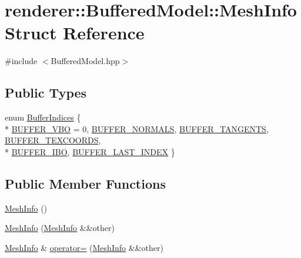 \hypertarget{structrenderer_1_1BufferedModel_1_1MeshInfo}{\section{renderer\-:\-:Buffered\-Model\-:\-:Mesh\-Info Struct Reference}
\label{structrenderer_1_1BufferedModel_1_1MeshInfo}
}


{\ttfamily \#include $<$Buffered\-Model.\-hpp$>$}

\subsection*{Public Types}
\begin{DoxyCompactItemize}
\item 
enum \hyperlink{structrenderer_1_1BufferedModel_1_1MeshInfo_ae21111fafd86318119b109567aa3e045}{Buffer\-Indices} \{ \\*
\hyperlink{structrenderer_1_1BufferedModel_1_1MeshInfo_ae21111fafd86318119b109567aa3e045a38c666d664c417e6e2c5f6c24f383d9f}{B\-U\-F\-F\-E\-R\-\_\-\-V\-B\-O} = 0, 
\hyperlink{structrenderer_1_1BufferedModel_1_1MeshInfo_ae21111fafd86318119b109567aa3e045af01865b4d93ad75e3aa7a5d06c3293d4}{B\-U\-F\-F\-E\-R\-\_\-\-N\-O\-R\-M\-A\-L\-S}, 
\hyperlink{structrenderer_1_1BufferedModel_1_1MeshInfo_ae21111fafd86318119b109567aa3e045a0aed1961b5cad93156f434426f4d00ec}{B\-U\-F\-F\-E\-R\-\_\-\-T\-A\-N\-G\-E\-N\-T\-S}, 
\hyperlink{structrenderer_1_1BufferedModel_1_1MeshInfo_ae21111fafd86318119b109567aa3e045ad034f51cd5206f7b1b6bda5dea2745f2}{B\-U\-F\-F\-E\-R\-\_\-\-T\-E\-X\-C\-O\-O\-R\-D\-S}, 
\\*
\hyperlink{structrenderer_1_1BufferedModel_1_1MeshInfo_ae21111fafd86318119b109567aa3e045aa89de91d1693360e6a9f4d6cf300cbe8}{B\-U\-F\-F\-E\-R\-\_\-\-I\-B\-O}, 
\hyperlink{structrenderer_1_1BufferedModel_1_1MeshInfo_ae21111fafd86318119b109567aa3e045a3c8fb6009b562aaf230fa5b7b2016a2d}{B\-U\-F\-F\-E\-R\-\_\-\-L\-A\-S\-T\-\_\-\-I\-N\-D\-E\-X}
 \}
\end{DoxyCompactItemize}
\subsection*{Public Member Functions}
\begin{DoxyCompactItemize}
\item 
\hyperlink{structrenderer_1_1BufferedModel_1_1MeshInfo_a4c4e27fb170cd67c9a023e7c039388da}{Mesh\-Info} ()
\item 
\hyperlink{structrenderer_1_1BufferedModel_1_1MeshInfo_ad114c1e8ca93d671d9cde58f14ac92b1}{Mesh\-Info} (\hyperlink{structrenderer_1_1BufferedModel_1_1MeshInfo}{Mesh\-Info} \&\&other)
\item 
\hyperlink{structrenderer_1_1BufferedModel_1_1MeshInfo}{Mesh\-Info} \& \hyperlink{structrenderer_1_1BufferedModel_1_1MeshInfo_a85c0622b28f04d412dca3e6127179dbe}{operator=} (\hyperlink{structrenderer_1_1BufferedModel_1_1MeshInfo}{Mesh\-Info} \&\&other)
\end{DoxyCompactItemize}

